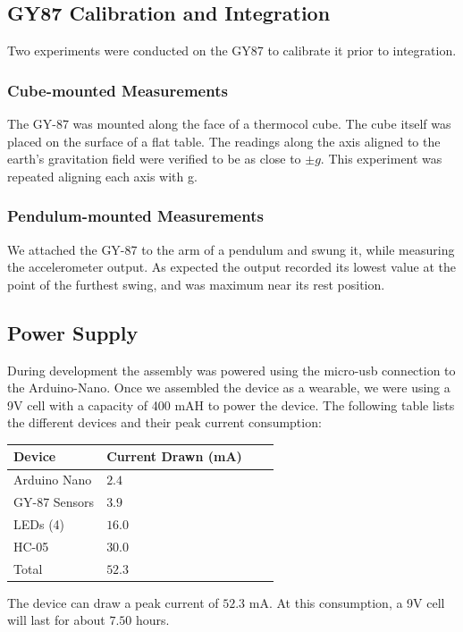 \documentclass[11pt, a4paper]{article}
\begin{document}
\subsection{GY87 Calibration and Integration}
Two experiments were conducted on the GY87 to calibrate it prior to
integration.

\subsubsection{Cube-mounted Measurements}
The GY-87 was mounted along the face of a thermocol cube. The cube itself was
placed on the surface of a flat table. The readings along the axis aligned to
the earth's gravitation field were verified to be as close to $\pm g$. This
experiment was repeated aligning each axis with g.

\subsubsection{Pendulum-mounted Measurements}
We attached the GY-87 to the arm of a pendulum and swung it, while measuring
the accelerometer output. As expected the output recorded its lowest value at
the point of the furthest swing, and was maximum near its rest position. 

\subsection{Power Supply}
During development the assembly was powered using the micro-usb connection to
the Arduino-Nano. Once we assembled the device as a wearable, we were using a
9V cell with a capacity of 400 mAH to power the device. The following table
lists the different devices and their peak current consumption:

\begin{center}
   \begin{tabular}{llll}
      \hline
      Device & Current Drawn (mA) \\
      \hline
      Arduino Nano & $2.4$ \\
      GY-87 Sensors & $3.9$ \\
      LEDs (4) & $16.0$ & \\
      HC-05 & $30.0$ \\
      \hline
      Total & $52.3$ \\
      \hline
   \end{tabular}
\end{center}

\noindent The device can draw a peak current of $52.3$ mA. At this
consumption, a 9V cell will last for about $7.50$ hours.
\end{document}

